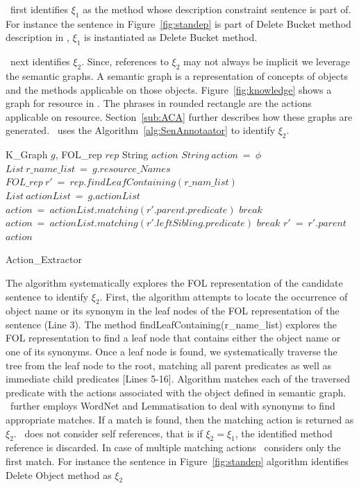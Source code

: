 \tool\ first identifies $\xi_1$ as the method whose description constraint sentence is part of.
For instance the sentence in Figure~\ref{fig:standep} is part of Delete Bucket method description in \amazonAPI,
$\xi_1$ is instantiated as Delete Bucket method.

\tool\ next identifies $\xi_2$. Since, references to $\xi_2$ may not always be implicit we leverage the semantic graphs. A semantic graph is a representation of concepts of objects and the methods applicable on those objects. Figure~\ref{fig:knowledge} shows a graph for  resource in \amazonAPI.
The phrases in rounded rectangle are the actions applicable on  resource.
Section~\ref{sub:ACA} further describes how these graphs are generated.
\tool\ uses the Algorithm~\ref{alg:SenAnnotaator} to identify $\xi_2$.
  

\begin{algorithm}[t!]
\begin{algorithmic}[1]
\begin{scriptsize}
\REQUIRE K\_Graph $g$, FOL\_rep $rep$ 
\ENSURE String $action$
\STATE $String\ action\ =\ \phi$
\STATE $List\ r\_name\_list\ =\ g.resource\_Names$
\STATE $FOL\_rep\ r'\ =\ rep.findLeafContaining(r\_nam\_list)$
\STATE $List\ actionList\ =\ g.actionList$
		\STATE $action\ =\ actionList.matching(r'.parent.predicate)$
		\STATE $break$
	\ELSE
			\STATE $action\ =\ actionList.matching(r'.leftSibling.predicate)$
			\STATE $break$
		\ENDIF
	\ENDIF
	\STATE $r'\ =\ r'.parent$
\ENDWHILE
\RETURN $action$
\end{scriptsize}
\end{algorithmic}
\caption{Action\_Extractor}
\label{alg:SenAnnotaator}
\end{algorithm} 

The algorithm systematically explores the FOL representation
of the candidate sentence to identify $\xi_2$. First, the algorithm
attempts to locate the occurrence of object name or its synonym
in the leaf nodes of the FOL
representation of the sentence (Line 3). The method
findLeafContaining(r\_name\_list) explores the FOL representation
to find a leaf node that contains either the object name
or one of its synonyms.
Once a leaf node is found, we systematically
traverse the tree from the leaf node to the root,
matching all parent predicates as well as immediate child
predicates [Lines 5-16].
Algorithm matches each of the traversed predicate
with the actions associated with the object defined in
semantic graph. 
\tool\ further employs WordNet and Lemmatisation to deal with
synonyms to find appropriate matches. If a match is
found, then the matching action is returned as $\xi_2$.
\tool\ does not consider self references, that is if $\xi_2 = \xi_1$, the identified method reference is discarded.
In case of multiple matching actions \tool\ considers only the first match.
For instance the sentence in Figure~\ref{fig:standep} algorithm identifies
Delete Object method as $\xi_2$

